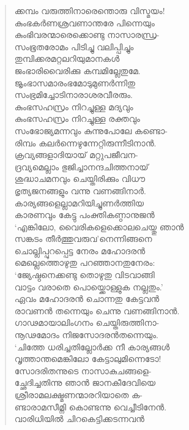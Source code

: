 \begin{verse}
ക്കമ്പം വരുത്തിനാരെന്തൊരു വിസ്മയം!\\
കുംഭകര്‍ണശ്രവണാന്തരേ പിന്നെയും\\
കുംഭിവരന്മാരെക്കൊണ്ടു നാസാരന്ധ്ര-\\
സംഭൂതരോമം പിടിച്ചു വലിപ്പിച്ചും\\
തുമ്പിക്കരമറ്റലറിയുമാനകള്‍\\
ജംഭാരിവൈരിക്കു കമ്പമില്ലേതുമേ.\\
ജൃംഭാസമാരംഭമോടുമുണര്‍ന്നിതു\\
സംഭ്രമിച്ചോടിനാരാശരവീരരും.\\
കുംഭസഹസ്രം നിറച്ചുള്ള മദ്യവും\\
കുംഭസഹസ്രം നിറച്ചുള്ള രക്തവും\\
സംഭോജ്യമന്നവും കുന്നുപോലേ കണ്ടൊ-\\
രിമ്പം കലര്‍ന്നെഴുന്നേറ്റിരുന്നീടിനാന്‍.\\
ക്രവ്യങ്ങളാദിയായ് മറ്റുപജീവന-\\
ദ്രവ്യമെല്ലാം ഭുജിച്ചാനന്ദചിത്തനായ്\\
ശുദ്ധാചമനവും ചെയ്തിരിക്കും വിധൗ\\
ഭൃത്യജനങ്ങളും വന്നു വണങ്ങിനാര്‍.\\
കാര്യങ്ങളെല്ലാമറിയിച്ചുണര്‍ത്തിയ\\
കാരണവും കേട്ടു പംക്തികണ്ഠാനുജന്‍\\
‘എങ്കിലോ, വൈരികളെക്കൊലചെയ്തു ഞാന്‍\\
സങ്കടം തീര്‍ത്തുവരുവ’നെന്നിങ്ങനെ\\
ചൊല്ലിപ്പുറപ്പെട്ട നേരം മഹോദരന്‍\\
മെല്ലെത്തൊഴുതു പറഞ്ഞാനതുനേരം:\\
‘ജ്യേഷ്ഠനെക്കണ്ടു തൊഴുതു വിടവാങ്ങി\\
വാട്ടം വരാതെ പൊയ്ക്കൊള്ളുക നല്ലതും.’\\
ഏവം മഹോദരന്‍ ചൊന്നതു കേട്ടവന്‍\\
രാവണന്‍ തന്നെയും ചെന്നു വണങ്ങിനാന്‍.\\
ഗാഢമായാലിംഗനം ചെയ്തിരുത്തിനാ-\\
നൂഢമോദം നിജസോദരന്‍തന്നെയും.\\
‘ചിത്തേ ധരിച്ചതില്ലോര്‍ക്ക നീ കാര്യങ്ങള്‍\\
വൃത്താന്തമെങ്കിലോ കേട്ടാലുമിന്നെടോ!\\
സോദരിതന്നുടെ നാസാകുചങ്ങളെ-\\
ച്ഛേദിച്ചതിന്നു ഞാന്‍ ജാനകീദേവിയെ\\
ശ്രീരാമലക്ഷ്മണന്മാരറിയാതെ ക-\\
ണ്ടാരാമസീമ്നി കൊണ്ടന്നു വെച്ചീടിനേന്‍.\\
വാരിധിയില്‍ ചിറകെട്ടിക്കടന്നവന്‍\\

\end{verse}
